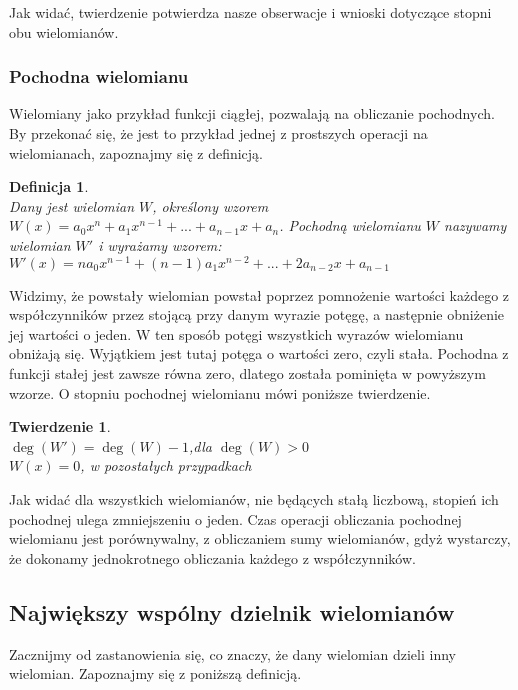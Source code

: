 \documentclass[twoside,a4paper]{book}
\newtheorem{theorem}{Twierdzenie}
\newtheorem{definition}{Definicja}
\begin{document}
Jak widać, twierdzenie potwierdza nasze obserwacje i wnioski dotyczące stopni obu wielomianów.

\subsubsection{Pochodna wielomianu}

Wielomiany jako przykład funkcji ciągłej, pozwalają na obliczanie pochodnych. By przekonać się, że jest to przykład jednej z prostszych operacji na wielomianach, zapoznajmy się z definicją.

\begin{definition}
	$ $\\
	Dany jest wielomian $W$, określony wzorem $W(x) = a_0x^n + a_1x^{n-1} + ... + a_{n-1}x + a_n$. Pochodną wielomianu $W$ nazywamy wielomian $W'$ i wyrażamy wzorem:
	$W'(x) = na_0x^{n-1} + (n-1)a_1x^{n-2} + ... + 2a_{n-2}x + a_{n-1}$
\end{definition}

Widzimy, że powstały wielomian powstał poprzez pomnożenie wartości każdego z współczynników przez stojącą przy danym wyrazie potęgę, a następnie obniżenie jej wartości o jeden. W ten sposób potęgi wszystkich wyrazów wielomianu obniżają się. Wyjątkiem jest tutaj potęga o wartości zero, czyli stała. Pochodna z funkcji stałej jest zawsze równa zero, dlatego została pominięta w powyższym wzorze. O stopniu pochodnej wielomianu mówi poniższe twierdzenie.

\begin{theorem}
$ $\\
$\deg(W') = \deg(W) - 1$,dla $\deg(W) > 0$ \\
$W(x) = 0$, w pozostałych przypadkach
\end{theorem}

Jak widać dla wszystkich wielomianów, nie będących stałą liczbową, stopień ich pochodnej ulega zmniejszeniu o jeden. Czas operacji obliczania pochodnej wielomianu jest porównywalny, z obliczaniem sumy wielomianów, gdyż wystarczy, że dokonamy jednokrotnego obliczania każdego z współczynników.

\subsection{Największy wspólny dzielnik wielomianów}

Zacznijmy od zastanowienia się, co znaczy, że dany wielomian dzieli inny wielomian. Zapoznajmy się z poniższą definicją.
\end{document}
